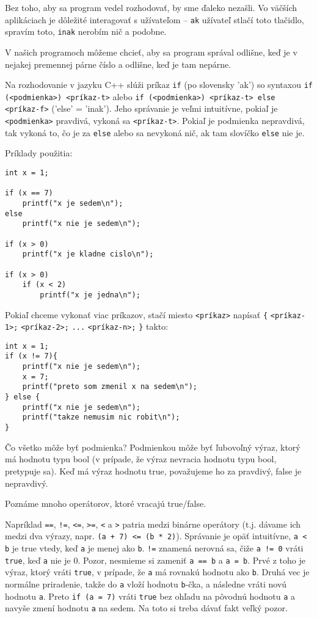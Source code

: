 
Bez toho, aby sa program vedel rozhodovať, by sme ďaleko nezašli. Vo väčších
aplikáciach je dôležité interagovať s užívateľom -- \verb!ak! užívateľ stlačí
toto tlačidlo, spravím toto, \verb!inak!  nerobím nič a podobne. 

V našich programoch môžeme chcieť, aby sa program správal odlišne, keď je v
nejakej premennej párne číslo a odlišne, keď je tam nepárne.

Na rozhodovanie v jazyku C++ slúži príkaz \verb!if! (po slovensky 'ak') so
syntaxou \verb!if (<podmienka>) <príkaz-t>! alebo \verb!if (<podmienka>) <príkaz-t> else <príkaz-f>!
('else' = 'inak'). Jeho správanie je veľmi intuitívne, pokiaľ je
\verb!<podmienka>! pravdivá, vykoná sa \verb!<príkaz-t>!.  Pokiaľ je podmienka
nepravdivá, tak vykoná to, čo je za \verb!else! alebo sa nevykoná nič, ak tam
slovíčko \verb!else! nie je.

Príklady použitia:
\begin{lstlisting}
int x = 1;

if (x == 7) 
    printf("x je sedem\n");
else
    printf("x nie je sedem\n");

if (x > 0)
    printf("x je kladne cislo\n");

if (x > 0)
    if (x < 2)
        printf("x je jedna\n");
\end{lstlisting}

Pokiaľ chceme vykonať viac príkazov, stačí miesto \verb!<príkaz>! napísať
\verb!{! \verb!<príkaz-1>;! \verb!<príkaz-2>;! \verb!...!  \verb!<príkaz-n>;!
\verb!}! takto:
\begin{lstlisting}
int x = 1;
if (x != 7){
    printf("x nie je sedem\n");
    x = 7;
    printf("preto som zmenil x na sedem\n");
} else {
    printf("x nie je sedem\n");
    printf("takze nemusim nic robit\n");
}
\end{lstlisting}

\medskip

Čo všetko môže byť podmienka? Podmienkou môže byť ľubovoľný výraz, ktorý má
hodnotu typu bool (v prípade, že výraz nevracia hodnotu typu bool, pretypuje sa).  Keď má výraz
hodnotu true, považujeme ho za pravdivý, false je nepravdivý.

Poznáme mnoho operátorov, ktoré vracajú true/false. 

Napríklad \verb'==', \verb'!=', \verb'<=', \verb'>=', \verb'<' a \verb'>' patria medzi binárne
operátory (t.j. dávame ich medzi dva výrazy, napr. \verb!(a + 7) <= (b * 2)!).
Správanie je opäť intuitívne, \verb'a < b' je true vtedy, keď \verb!a! je menej ako
\verb!b!.  \verb'!=' znamená nerovná sa, čiže \verb'a != 0' vráti \verb!true!, keď
\verb!a! nie je 0. Pozor, nesmieme si zameniť \verb'a == b' a \verb'a = b'.  Prvé z
toho je výraz, ktorý vráti \verb!true!, v prípade, že \verb!a! má rovnakú hodnotu
ako \verb!b!. Druhá vec je normálne priradenie, takže do \verb!a! vloží hodnotu \verb!b!-čka,
a následne vráti novú hodnotu \verb!a!. Preto \verb!if (a = 7)! vráti \verb!true!
bez ohľadu na pôvodnú hodnotu \verb!a! a navyše zmení hodnotu \verb!a! na sedem.  Na toto
si treba dávať fakt veľký pozor. 

